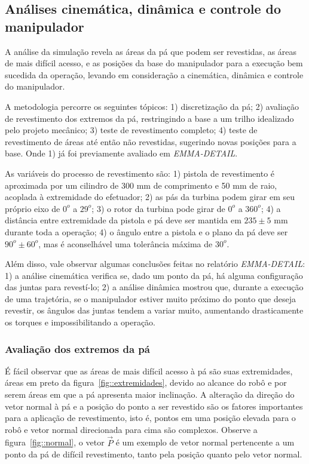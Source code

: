\subsection{Análises cinemática, dinâmica e
controle do manipulador}

A análise da simulação revela as áreas da pá que podem ser revestidas,
as áreas de mais difícil acesso, e as posições da base do manipulador para a
execução bem sucedida da operação, levando em consideração a cinemática,
dinâmica e controle do manipulador. 

A metodologia percorre os seguintes tópicos: 1) discretização da pá; 2)
avaliação de revestimento dos extremos da pá, restringindo a base a um trilho
idealizado pelo projeto mecânico; 3) teste de revestimento completo; 4) teste de
revestimento de áreas até então não revestidas, sugerindo novas posições para a
base. Onde 1) já foi previamente avaliado em \textit{EMMA-DETAIL}. 

As variáveis do processo de revestimento são: 1) pistola de revestimento
é aproximada por um cilindro de 300 mm de comprimento e 50 mm de raio, 
acoplada à extremidade do efetuador; 2) as pás da turbina podem girar em seu
próprio eixo de $0^o$ a $29^o$; 3) o rotor da turbina pode girar de
$0^o$ a $360^o$; 4) a distância entre extremidade da pistola e pá deve
ser mantida em $235 \pm 5$ mm durante toda a operação; 4) o ângulo entre a
pistola e o plano da pá deve ser $90^o \pm 60^o$, mas é aconselhável uma
tolerância máxima de $30^o$.

Além disso, vale observar algumas conclusões feitas no relatório
\textit{EMMA-DETAIL}: 1) a análise cinemática verifica se, dado um ponto da
pá, há alguma configuração das juntas para revestí-lo; 2) a análise dinâmica
mostrou que, durante a execução de uma trajetória, se o manipulador estiver
muito próximo do ponto que deseja revestir, os ângulos das juntas tendem a
variar muito, aumentando drasticamente os torques e impossibilitando a operação.


\subsubsection{Avaliação dos extremos da pá} 

É fácil observar que as áreas de mais difícil acesso à pá são suas extremidades,
áreas em preto da figura~\ref{fig::extremidades}, devido ao alcance do robô e
por serem áreas em que a pá apresenta maior inclinação. A alteração da direção
do vetor normal à pá e a posição do ponto a ser revestido são os fatores 
importantes para a aplicação de revestimento, isto é, pontos em uma posição
elevada para o robô e vetor normal direcionada para cima são complexos. Observe
a figura~\ref{fig::normal}, o vetor $\vec{P}$ é um exemplo de vetor normal
pertencente a um ponto da pá de difícil revestimento, tanto pela posição quanto
pelo vetor normal.

